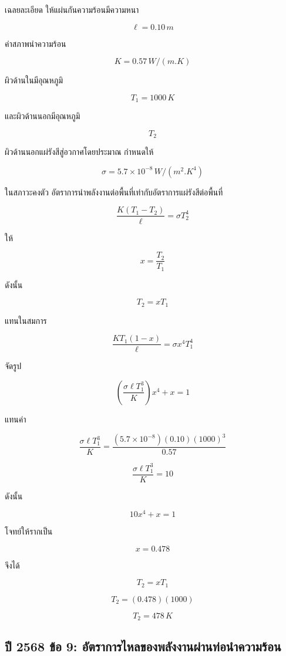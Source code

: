\begin{examplebox}{เฉลยละเอียด}
ให้แผ่นกันความร้อนมีความหนา

\[
\ell=0.10\,\si{m}
\]

ค่าสภาพนำความร้อน

\[
K=0.57\,\si{W/(m.K)}
\]

ผิวด้านในมีอุณหภูมิ

\[
T_1=1000\,\si{K}
\]

และผิวด้านนอกมีอุณหภูมิ

\[
T_2
\]

ผิวด้านนอกแผ่รังสีสู่อวกาศโดยประมาณ กำหนดให้

\[
\sigma=5.7\times10^{-8}\,\si{W/(m^2.K^4)}
\]

ในสภาวะคงตัว อัตราการนำพลังงานต่อพื้นที่เท่ากับอัตราการแผ่รังสีต่อพื้นที่

\[
\frac{K(T_1-T_2)}{\ell}
=
\sigma T_2^4
\]

ให้

\[
x=\frac{T_2}{T_1}
\]

ดังนั้น

\[
T_2=xT_1
\]

แทนในสมการ

\[
\frac{KT_1(1-x)}{\ell}
=
\sigma x^4T_1^4
\]

จัดรูป

\[
\left(
\frac{\sigma\ell T_1^3}{K}
\right)x^4+x=1
\]

แทนค่า

\[
\frac{\sigma\ell T_1^3}{K}
=
\frac{(5.7\times10^{-8})(0.10)(1000)^3}{0.57}
\]

\[
\frac{\sigma\ell T_1^3}{K}=10
\]

ดังนั้น

\[
10x^4+x=1
\]

โจทย์ให้รากเป็น

\[
x=0.478
\]

จึงได้

\[
T_2=xT_1
\]

\[
T_2=(0.478)(1000)
\]

\[
\boxed{
T_2=478\,\si{K}
}
\]
\end{examplebox}

\subsection{ปี 2568 ข้อ 9: อัตราการไหลของพลังงานผ่านท่อนำความร้อน}

\vspace{1em}


